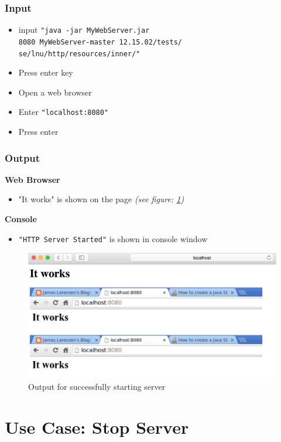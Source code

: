 \documentclass[a4paper, 12pt]{article}
\begin{document}
\subsubsection{Input}
\begin{itemize}
\item input \texttt{"java -jar MyWebServer.jar \\
8080 MyWebServer-master\ 12.15.02/tests/\\se/lnu/http/resources/inner/"}
\item Press enter key
\item Open a web browser
\item Enter \texttt{"localhost:8080"}
\item Press enter
\end{itemize}

\subsubsection{Output}
\textbf{Web Browser}
\begin{itemize}
\item "It works" is shown on the page \textit{(see figure: \ref{TC1.1})}
\end{itemize}

\textbf{Console}
\begin{itemize}
\item \texttt{"HTTP Server Started"} is shown in console window
\end{itemize}

\begin{figure}[H]
\centering
\includegraphics[scale=0.5]{output_clarification/TC1-1.png} 
\caption{Output for successfully starting server}
\label{TC1.1}
\end{figure}

\newpage
\section{Use Case: Stop Server}
\end{document}
